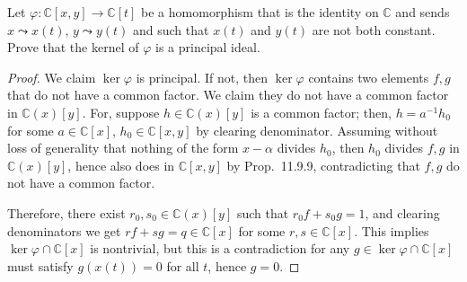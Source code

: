 \documentclass[12pt]{article}
\theoremstyle{remark}
\begin{document}
\begin{problem}
  Let $\varphi\colon \mathbb{C}[x,y] \to \mathbb{C}[t]$ be a homomorphism that is the identity on $\mathbb{C}$ and sends $x \leadsto x(t)$, $y \leadsto y(t)$ and such that $x(t)$ and $y(t)$ are not both constant.  Prove that the kernel of $\varphi$ is a principal ideal.
\end{problem}
\begin{proof}
  We claim $\ker\varphi$ is principal. If not, then $\ker\varphi$ contains two elements $f,g$ that do not have a common factor. We claim they do not have a common factor in $\mathbb{C}(x)[y]$. For, suppose $h \in \mathbb{C}(x)[y]$ is a common factor; then, $h = a^{-1}h_0$ for some $a\in \mathbb{C}[x]$, $h_0 \in \mathbb{C}[x,y]$ by clearing denominator. Assuming without loss of generality that nothing of the form $x-\alpha$ divides $h_0$, then $h_0$ divides $f,g$ in $\mathbb{C}(x)[y]$, hence also does in $\mathbb{C}[x,y]$ by Prop.~11.9.9, contradicting that $f,g$ do not have a common factor.
  \par Therefore, there exist $r_0,s_0 \in \mathbb{C}(x)[y]$ such that $r_0f + s_0g = 1$, and clearing denominators we get $rf + sg = q \in \mathbb{C}[x]$ for some $r,s \in \mathbb{C}[x]$. This implies $\ker\varphi \cap \mathbb{C}[x]$ is nontrivial, but this is a contradiction for any $g \in \ker\varphi \cap \mathbb{C}[x]$ must satisfy $g(x(t)) = 0$ for all $t$, hence $g=0$.
\end{proof}

\begingroup
\renewcommand{\thesubsection}{\thesection.\Alph{subsection}}
\setcounter{subsection}{12}
\end{document}
